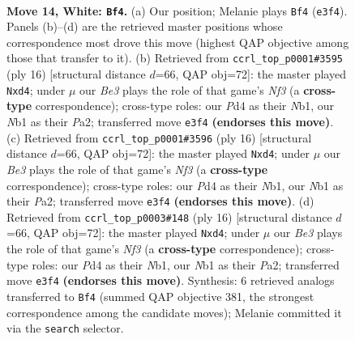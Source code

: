 \documentclass[11pt]{article}
\begin{document}
\clearpage

\begin{figure}[p]\centering
\begin{subfigure}{0.46\textwidth}\centering
\resizebox{\linewidth}{!}{%
\newchessgame
\chessboard[
  setfen={rnbqr2k/p5pp/2pb1n2/1p1p1p2/3P4/4BNP1/PPQ1PPBP/RN3RK1 w - - 8 14},
  showmover=false,
  pgfstyle=straightmove, color=movearrow, markmove={e3-f4}
]}
\caption{}
\end{subfigure}\hfill
\begin{subfigure}{0.46\textwidth}\centering
\resizebox{\linewidth}{!}{%
\newchessgame
\chessboard[
  setfen={rnq1kb1r/pb1p1ppp/1p2pn2/8/Q1Pp1B2/5NP1/PP2PPBP/RN3RK1 w kq - 0 9},
  showmover=false,
  pgfstyle=straightmove, color=movearrow, markmove={f3-d4}
]}
\caption{}
\end{subfigure}
\\[4pt]
\begin{subfigure}{0.46\textwidth}\centering
\resizebox{\linewidth}{!}{%
\newchessgame
\chessboard[
  setfen={rnq1kb1r/pb1p1ppp/1p2pn2/8/Q1Pp1B2/5NP1/PP2PPBP/RN3RK1 w kq - 0 9},
  showmover=false,
  pgfstyle=straightmove, color=movearrow, markmove={f3-d4}
]}
\caption{}
\end{subfigure}\hfill
\begin{subfigure}{0.46\textwidth}\centering
\resizebox{\linewidth}{!}{%
\newchessgame
\chessboard[
  setfen={rnq1kb1r/pb1p1ppp/1p2pn2/8/Q1Pp1B2/5NP1/PP2PPBP/RN3RK1 w kq - 0 9},
  showmover=false,
  pgfstyle=straightmove, color=movearrow, markmove={f3-d4}
]}
\caption{}
\end{subfigure}
\caption{\textbf{Move 14, White: \texttt{Bf4}.} (a) Our position; Melanie plays \texttt{Bf4} (\texttt{e3f4}). Panels (b)--(d) are the retrieved master positions whose correspondence most drove this move (highest QAP objective among those that transfer to it). (b) Retrieved from \texttt{ccrl\_top\_p0001\#3595} (ply 16) [structural distance $d$=66, QAP obj=72]: the master played \texttt{Nxd4}; under $\mu$ our \emph{Be3} plays the role of that game's \emph{Nf3} (a \textbf{cross-type} correspondence); cross-type roles: our \emph{P}d4 as their \emph{N}b1, our \emph{N}b1 as their \emph{P}a2; transferred move \texttt{e3f4} \textbf{(endorses this move)}. (c) Retrieved from \texttt{ccrl\_top\_p0001\#3596} (ply 16) [structural distance $d$=66, QAP obj=72]: the master played \texttt{Nxd4}; under $\mu$ our \emph{Be3} plays the role of that game's \emph{Nf3} (a \textbf{cross-type} correspondence); cross-type roles: our \emph{P}d4 as their \emph{N}b1, our \emph{N}b1 as their \emph{P}a2; transferred move \texttt{e3f4} \textbf{(endorses this move)}. (d) Retrieved from \texttt{ccrl\_top\_p0003\#148} (ply 16) [structural distance $d$=66, QAP obj=72]: the master played \texttt{Nxd4}; under $\mu$ our \emph{Be3} plays the role of that game's \emph{Nf3} (a \textbf{cross-type} correspondence); cross-type roles: our \emph{P}d4 as their \emph{N}b1, our \emph{N}b1 as their \emph{P}a2; transferred move \texttt{e3f4} \textbf{(endorses this move)}. Synthesis: 6 retrieved analogs transferred to \texttt{Bf4} (summed QAP objective 381, the strongest correspondence among the candidate moves); Melanie committed it via the \texttt{search} selector.}
\label{fig:thought-m26}
\end{figure}
\end{document}
